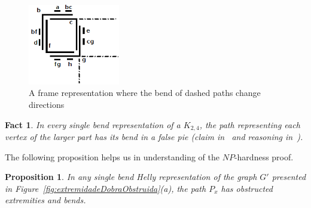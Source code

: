 \documentclass[
submission
]{dmtcs-episciences}
\newtheorem{prop}[theorem]{Proposition}
\newtheorem{fact}[theorem]{Fact}
\begin{document}
%
\begin{figure}[htb]	
\center%
\includegraphics[width=4cm]{outraRepresentacaoFrame3}
\caption{A frame representation where the bend of dashed paths change directions}
\label{fig:outraRepresentacaoFrame}
\end{figure}




\begin{fact} \label{fact:k24facts}
In every single bend representation of a $K_{2,4}$, the path representing each vertex of the larger part has its bend in a false pie (claim in~\cite{daniel2014b} and reasoning in~\cite{Asinowski2009}).
\end{fact} %

The following proposition helps us in understanding of the $NP$-hardness proof.

\begin{prop}
In any single bend Helly representation of the graph $G'$ presented in Figure~\ref{fig:extremidadeDobraObstruida}(a), the path $P_{x}$ has obstructed extremities and bends.
\end{prop}
\end{document}
